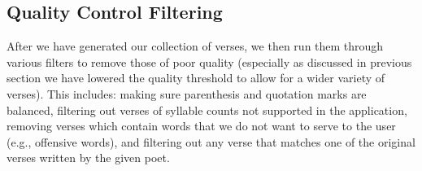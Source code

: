 \documentclass[11pt]{article}
\begin{document}






\subsection{Quality Control Filtering}\label{quality}

After we have generated our collection of verses, we then run them through various filters to remove those of poor quality (especially as discussed in previous section we have lowered the quality threshold to allow for a wider variety of verses).
This includes: making sure parenthesis and quotation marks are balanced, filtering out verses of syllable counts not supported in the application, removing verses which contain words that we do not want to serve to the user (e.g., offensive words), and filtering out any verse that matches one of the original verses written by the given poet.
\end{document}
